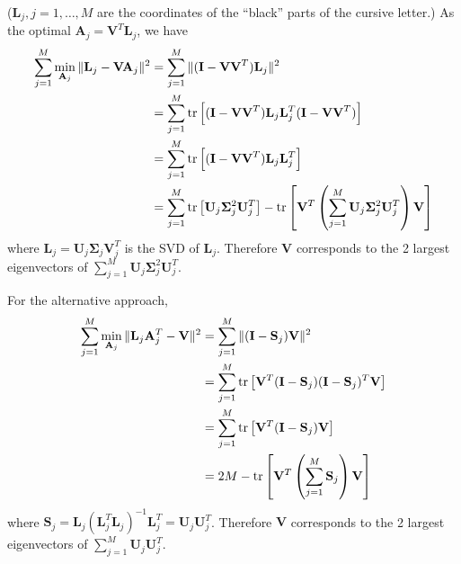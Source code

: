 \begin{exercise}
  ($\mathbf{L}_j, j=1,\ldots,M$ are the coordinates of the ``black'' parts of
  the cursive letter.) As the optimal $\mathbf{A}_j =
  \mathbf{V}^T\mathbf{L}_j$, we have
  \begin{align}
    \sum_{j = 1}^M\min_{\mathbf{A}_j}\|\mathbf{L}_j - \mathbf{V}\mathbf{A}_j\|^2
    &= \sum_{j = 1}^M\|(\mathbf{I} - \mathbf{VV}^T)\mathbf{L}_j\|^2 \notag \\
    &= \sum_{j = 1}^M\tr\left[(\mathbf{I} - \mathbf{VV}^T)
    \mathbf{L}_j\mathbf{L}_j^T (\mathbf{I} - \mathbf{VV}^T)\right] \notag\\
    &= \sum_{j = 1}^M\tr\left[(\mathbf{I} - \mathbf{VV}^T)
    \mathbf{L}_j\mathbf{L}_j^T \right] \notag \\
    &= \sum_{j =
    1}^M\tr\left[\mathbf{U}_j\mathbf{\Sigma}_j^2\mathbf{U}_j^T\right] -
    \tr\left[\mathbf{V}^T \left( \sum_{j = 1}^M
    \mathbf{U}_j\mathbf{\Sigma}_j^2\mathbf{U}_j^T\right) \mathbf{V}\right]
  \end{align}
  where $\mathbf{L}_j = \mathbf{U}_j\mathbf{\Sigma}_j\mathbf{V}_j^T$ is the SVD
  of $\mathbf{L}_j$. Therefore $\mathbf{V}$ corresponds to the 2 largest
  eigenvectors of $\sum_{j = 1}^M \mathbf{U}_j\mathbf{\Sigma}_j^2\mathbf{U}_j^T$.
  
  For the alternative approach,
  \begin{align}
    \sum_{j = 1}^M\min_{\mathbf{A}_j}\|\mathbf{L}_j\mathbf{A}_j^T -
    \mathbf{V}\|^2 &= \sum_{j = 1}^M\|(\mathbf{I} - \mathbf{S}_j)\mathbf{V}\|^2
    \notag \\
    &= \sum_{j = 1}^M\tr\left[\mathbf{V}^T (\mathbf{I} - \mathbf{S}_j)
    (\mathbf{I} - \mathbf{S}_j)^T \mathbf{V}\right] \notag \\
    &= \sum_{j = 1}^M\tr\left[\mathbf{V}^T (\mathbf{I} - \mathbf{S}_j)
    \mathbf{V}\right] \notag \\
    &= 2M - \tr\left[\mathbf{V}^T \left(\sum_{j = 1}^M\mathbf{S}_j\right)
    \mathbf{V}\right]
  \end{align}
  where $\mathbf{S}_j =
  \mathbf{L}_j(\mathbf{L}_j^T\mathbf{L}_j)^{-1} \mathbf{L}_j^T =
  \mathbf{U}_j\mathbf{U}_j^T$. Therefore $\mathbf{V}$ corresponds to the 2
  largest eigenvectors of $\sum_{j = 1}^M \mathbf{U}_j\mathbf{U}_j^T$.
\end{exercise}